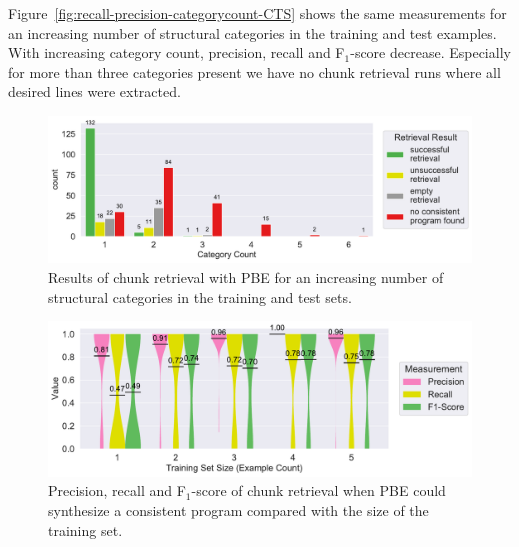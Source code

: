 Figure~\ref{fig:recall-precision-categorycount-CTS} shows the same measurements for an increasing number of structural categories in the training and test examples.
With increasing category count, precision, recall and F$_{1}$-score decrease.
Especially for more than three categories present we have no chunk retrieval runs where all desired lines were extracted.


\begin{figure}[!t]
		\centering
		\includegraphics[width=\columnwidth, clip]{img/big-study/failure-reason-categorycount-PBE.pdf}
		\caption{Results of chunk retrieval with PBE for an increasing number of structural categories in the training and test sets.}
		\label{fig:failure-reason-categorycount-PBE}
\end{figure}

\begin{figure}[!t]
		\centering
		\includegraphics[width=\columnwidth, clip]{img/big-study/recall-precision-examplecount-sythesisworked-PBE.pdf}
		\caption{Precision, recall and F$_{1}$-score of chunk retrieval when PBE could synthesize a consistent program compared with the size of the training set.}
		\label{fig:recall-precision-examplecount-sythesisworked-PBE}
\end{figure}


